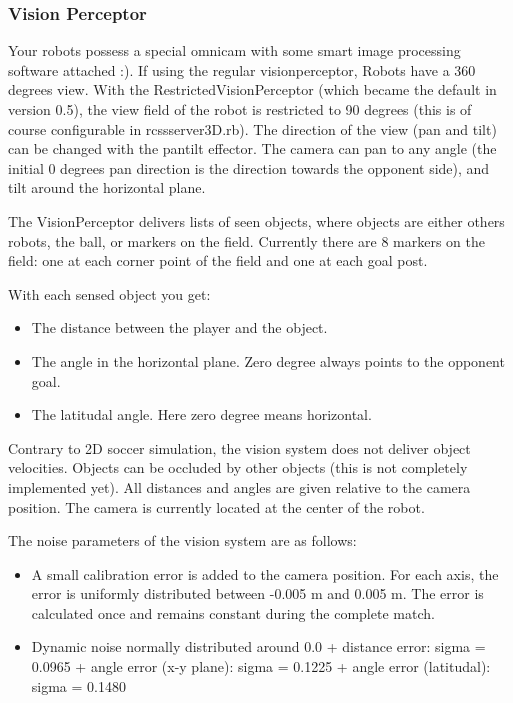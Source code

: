 \subsubsection{Vision Perceptor}
Your robots possess a special omnicam with some smart image processing
software attached :). If using the regular visionperceptor, Robots
have a 360 degrees view. With the RestrictedVisionPerceptor (which
became the default in version 0.5), the view field of the robot is
restricted to 90 degrees (this is of course configurable in
rcssserver3D.rb). The direction of the view (pan and tilt) can be
changed with the pantilt effector. The camera can pan to any angle
(the initial 0 degrees pan direction is the direction towards the
opponent side), and tilt around the horizontal plane.

The VisionPerceptor delivers lists of seen objects, where objects are
either others robots, the ball, or markers on the field. Currently
there are 8 markers on the field: one at each corner point of the
field and one at each goal post.

With each sensed object you get:

\begin{itemize}
  \item The distance between the player and the object.
  \item The angle in the horizontal plane. Zero degree always points to the
opponent goal.
  \item The latitudal angle. Here zero degree means horizontal. 
\end{itemize}

Contrary to 2D soccer simulation, the vision system does not deliver
object velocities. Objects can be occluded by other objects (this is
not completely implemented yet). All distances and angles are given
relative to the camera position. The camera is currently located at
the center of the robot.

The noise parameters of the vision system are as follows:
\begin{itemize}
  \item A small calibration error is added to the camera position. For each
  axis, the error is uniformly distributed between -0.005 m and 0.005 m. The
  error is calculated once and remains constant during the complete match.
  \item Dynamic noise normally distributed around 0.0
  + distance error:  sigma = 0.0965
  + angle error (x-y plane): sigma = 0.1225
  + angle error (latitudal): sigma = 0.1480
\end{itemize}

